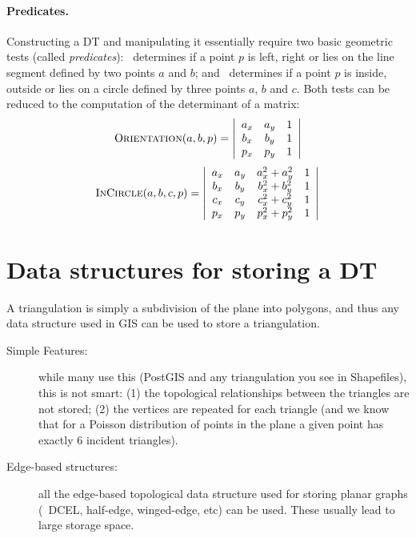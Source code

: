 \paragraph{Predicates.}
Constructing a DT and manipulating it essentially require two basic geometric tests (called \emph{predicates}): \Orient\ determines if a point $p$ is left, right or lies on the line segment defined by two points $a$ and $b$; and \Incircle\ determines if a point $p$ is inside, outside or lies on a circle defined by three points $a$, $b$ and $c$. 
Both tests can be reduced to the computation of the determinant of a matrix:
\begin{equation}
  \textrm{O}\textsc{rientation}(a, b, p) = 
  \left| 
  \begin{array}{cccc}
    a_{x} & a_{y} & 1 \\
    b_{x} & b_{y} & 1 \\
    p_{x} & p_{y} & 1 
  \end{array} 
  \right| 
\end{equation}
\begin{equation}
  \textrm{I}\textsc{n}\textrm{C}\textsc{ircle}(a, b, c, p) = 
  \left| 
  \begin{array}{ccccc}
    a_{x} & a_{y} & a^{2}_{x} + a^{2}_{y} & 1 \\
    b_{x} & b_{y} & b^{2}_{x} + b^{2}_{y} & 1 \\
    c_{x} & c_{y} & c^{2}_{x} + c^{2}_{y} & 1 \\
    p_{x} & p_{y} & p^{2}_{x} + p^{2}_{y} & 1 
  \end{array} 
  \right|%
\label{eq:insphere}
\end{equation}


\section[DT data structures]{Data structures for storing a DT}

A triangulation is simply a subdivision of the plane into polygons, and thus any data structure used in GIS can be used to store a triangulation.

\begin{description}
  \item[Simple Features:] while many use this (PostGIS and any triangulation you see in Shapefiles), this is not smart: (1) the topological relationships between the triangles are not stored; (2) the vertices are repeated for each triangle (and we know that for a Poisson distribution of points in the plane a given point has exactly 6 incident triangles).
  \item[Edge-based structures:] all the edge-based topological data structure used for storing planar graphs (\eg\ DCEL, half-edge, winged-edge, etc) can be used. These usually lead to large storage space.
\end{description}

